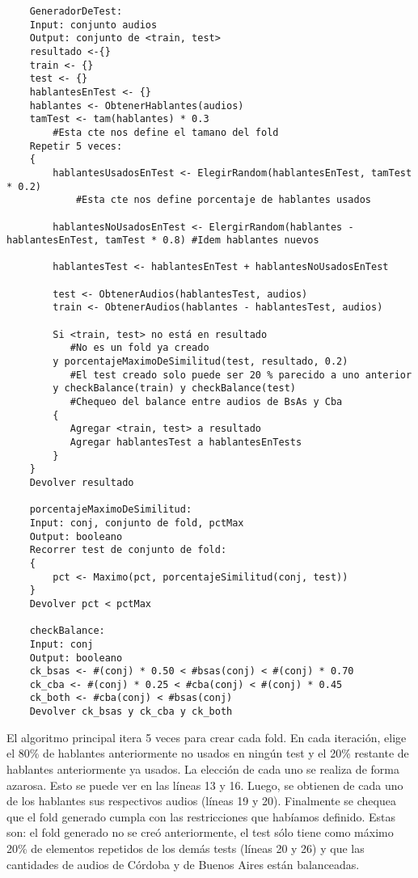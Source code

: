 \begin{lstlisting}
    GeneradorDeTest:
    Input: conjunto audios
    Output: conjunto de <train, test>
    resultado <-{}
    train <- {}
    test <- {}
    hablantesEnTest <- {}
    hablantes <- ObtenerHablantes(audios)
    tamTest <- tam(hablantes) * 0.3 
        #Esta cte nos define el tamano del fold
    Repetir 5 veces:
    {
        hablantesUsadosEnTest <- ElegirRandom(hablantesEnTest, tamTest * 0.2) 
            #Esta cte nos define porcentaje de hablantes usados
    
        hablantesNoUsadosEnTest <- ElergirRandom(hablantes - hablantesEnTest, tamTest * 0.8) #Idem hablantes nuevos
    
        hablantesTest <- hablantesEnTest + hablantesNoUsadosEnTest

        test <- ObtenerAudios(hablantesTest, audios)
        train <- ObtenerAudios(hablantes - hablantesTest, audios)

        Si <train, test> no está en resultado 
           #No es un fold ya creado
        y porcentajeMaximoDeSimilitud(test, resultado, 0.2) 
           #El test creado solo puede ser 20 % parecido a uno anterior
        y checkBalance(train) y checkBalance(test) 
           #Chequeo del balance entre audios de BsAs y Cba
        {
           Agregar <train, test> a resultado
           Agregar hablantesTest a hablantesEnTests
        }
    }
    Devolver resultado
    
    porcentajeMaximoDeSimilitud:
    Input: conj, conjunto de fold, pctMax
    Output: booleano
    Recorrer test de conjunto de fold:
    {
        pct <- Maximo(pct, porcentajeSimilitud(conj, test))
    }
    Devolver pct < pctMax

    checkBalance:
    Input: conj
    Output: booleano
    ck_bsas <- #(conj) * 0.50 < #bsas(conj) < #(conj) * 0.70
    ck_cba <- #(conj) * 0.25 < #cba(conj) < #(conj) * 0.45
    ck_both <- #cba(conj) < #bsas(conj)
    Devolver ck_bsas y ck_cba y ck_both
\end{lstlisting}

El algoritmo principal itera 5 veces para crear cada fold. En cada iteración, elige el 80\% de hablantes anteriormente no usados en ningún test y el 20\% restante de hablantes anteriormente ya usados. La elección de cada uno se realiza de forma azarosa. Esto se puede ver en las líneas 13 y 16. Luego, se obtienen de cada uno de los hablantes sus respectivos audios (líneas 19 y 20). Finalmente se chequea que el fold generado cumpla con las restricciones que habíamos definido. Estas son: el fold generado no se creó anteriormente, el test sólo tiene como máximo 20\% de elementos repetidos de los demás tests (líneas 20 y 26) y que las cantidades de audios de Córdoba y de Buenos Aires están balanceadas.

